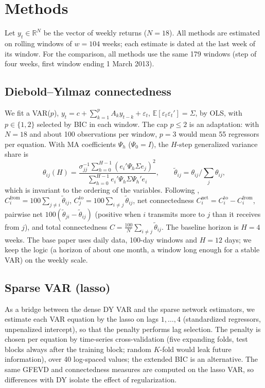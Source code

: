\section{Methods}\label{sec:methods}

Let $y_t\in\mathbb{R}^N$ be the vector of weekly returns ($N=18$). All methods are estimated on rolling windows of $w=104$ weeks; each estimate is dated at the last week of its window. For the comparison, all methods use the same 179 windows (step of four weeks, first window ending 1 March 2013).

\subsection{Diebold--Y{\i}lmaz connectedness}
We fit a VAR($p$), $y_t = c + \sum_{k=1}^p A_k y_{t-k} + \varepsilon_t$, $\mathbb{E}[\varepsilon_t\varepsilon_t'] = \Sigma$, by OLS, with $p\in\{1,2\}$ selected by BIC in each window. The cap $p\le 2$ is an adaptation: with $N=18$ and about 100 observations per window, $p=3$ would mean 55 regressors per equation. With MA coefficients $\Psi_h$ ($\Psi_0=I$), the $H$-step generalized variance share \citep{pesaran1998generalized} is
\begin{equation}
\theta_{ij}(H) = \frac{\sigma_{jj}^{-1}\sum_{h=0}^{H-1}(e_i'\Psi_h\Sigma e_j)^2}{\sum_{h=0}^{H-1} e_i'\Psi_h\Sigma\Psi_h' e_i},
\qquad \tilde\theta_{ij} = \theta_{ij}\Big/\textstyle\sum_{j}\theta_{ij},
\end{equation}
which is invariant to the ordering of the variables. Following \citet{diebold2014network}, $C^{\text{from}}_i = 100\sum_{j\ne i}\tilde\theta_{ij}$, $C^{\text{to}}_j = 100\sum_{i\ne j}\tilde\theta_{ij}$, net connectedness $C^{\text{net}}_i = C^{\text{to}}_i - C^{\text{from}}_i$, pairwise net $100(\tilde\theta_{ji}-\tilde\theta_{ij})$ (positive when $i$ transmits more to $j$ than it receives from $j$), and total connectedness $C = \frac{100}{N}\sum_{i\ne j}\tilde\theta_{ij}$. The baseline horizon is $H=4$ weeks. The base paper uses daily data, 100-day windows and $H=12$ days; we keep the logic (a horizon of about one month, a window long enough for a stable VAR) on the weekly scale.

\subsection{Sparse VAR (lasso)}
As a bridge between the dense DY VAR and the sparse network estimators, we estimate each VAR equation by the lasso \citep{tibshirani1996lasso} on lags $1,\dots,4$ (standardized regressors, unpenalized intercept), so that the penalty performs lag selection. The penalty is chosen per equation by time-series cross-validation (five expanding folds, test blocks always after the training block; random $K$-fold would leak future information), over 40 log-spaced values; the extended BIC \citep{chen2008ebic} is an alternative. The same GFEVD and connectedness measures are computed on the lasso VAR, so differences with DY isolate the effect of regularization.


